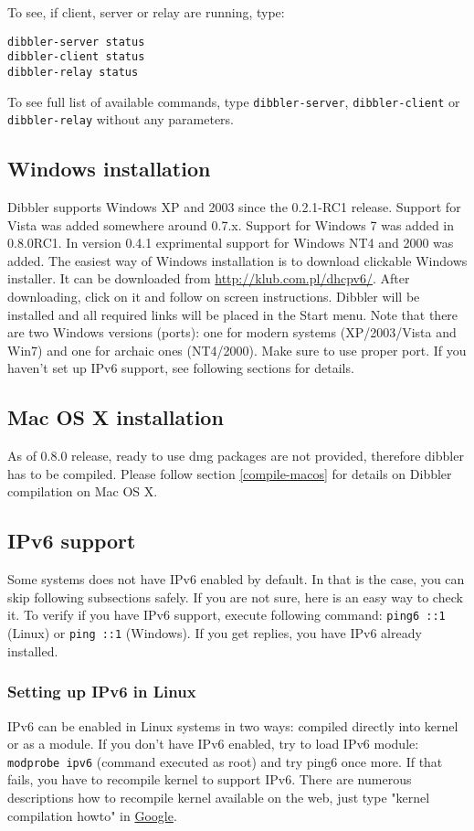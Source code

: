 To see, if client, server or relay are running, type:

\begin{verbatim}
dibbler-server status
dibbler-client status
dibbler-relay status
\end{verbatim}

To see full list of available commands, type \verb+dibbler-server+,
\verb+dibbler-client+ or \verb+dibbler-relay+ without any parameters.

\subsection{Windows installation}
Dibbler supports Windows XP and 2003 since the 0.2.1-RC1 release.
Support for Vista was added somewhere around 0.7.x. Support for
Windows 7 was added in 0.8.0RC1. In version 0.4.1 exprimental support
for Windows NT4 and 2000 was added. The easiest way of Windows
installation is to download clickable Windows installer. It can be
downloaded from \url{http://klub.com.pl/dhcpv6/}. After downloading,
click on it and follow on screen instructions. Dibbler will be
installed and all required links will be placed in the Start
menu. Note that there are two Windows versions (ports): one for modern
systems (XP/2003/Vista and Win7) and one for archaic ones
(NT4/2000). Make sure to use proper port. If you haven't set up IPv6
support, see following sections for details.

\subsection{Mac OS X installation}
As of 0.8.0 release, ready to use dmg packages are not provided,
therefore dibbler has to be compiled. Please follow section
\ref{compile-macos} for details on Dibbler compilation on Mac OS X.

\subsection{IPv6 support}
Some systems does not have IPv6 enabled by default. In that is the case,
you can skip following subsections safely. If you are not sure, here is
an easy way to check it. To verify if you have IPv6 support, execute
following command: \verb+ping6 ::1+ (Linux) or \verb+ping ::1+
(Windows). If you get replies, you have IPv6 already installed.

\subsubsection{Setting up IPv6 in Linux}
IPv6 can be enabled in Linux systems in two ways: compiled directly
into kernel or as a module. If you don't have IPv6 enabled, try to load IPv6 module:
\verb+modprobe ipv6+ (command executed as root) and try ping6 once more. If that
fails, you have to recompile kernel to support IPv6. There are
numerous descriptions how to recompile kernel available on the web, just
type "kernel compilation howto" in \href{http://www.google.com}{Google}.

